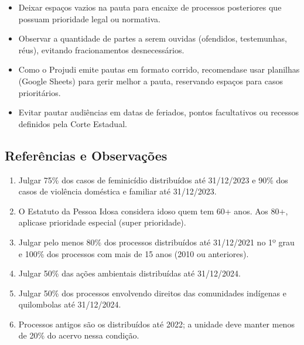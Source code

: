 \documentclass[letterpaper,10pt,brazil]{sphinxmanual}
\begin{document}
\sphinxAtStartPar
{}
\begin{itemize}
\item {} 
\sphinxAtStartPar
Deixar espaços vazios na pauta para encaixe de processos posteriores que possuam prioridade legal ou normativa.

\item {} 
\sphinxAtStartPar
Observar a quantidade de partes a serem ouvidas (ofendidos, testemunhas, réus), evitando fracionamentos desnecessários.

\item {} 
\sphinxAtStartPar
Como o Projudi emite pautas em formato corrido, recomenda\sphinxhyphen{}se usar planilhas (Google Sheets) para gerir melhor a pauta, reservando espaços para casos prioritários.

\item {} 
\sphinxAtStartPar
Evitar pautar audiências em datas de feriados, pontos facultativos ou recessos definidos pela Corte Estadual.

\end{itemize}


\subsection{Referências e Observações}
\label{\detokenize{05pautaraij:referencias-e-observacoes}}\begin{enumerate}
%
\item {} 
\sphinxAtStartPar
{} Julgar 75\% dos casos de feminicídio distribuídos até 31/12/2023 e 90\% dos casos de violência doméstica e familiar até 31/12/2023.

\item {} 
\sphinxAtStartPar
{} O Estatuto da Pessoa Idosa considera idoso quem tem 60+ anos. Aos 80+, aplica\sphinxhyphen{}se prioridade especial (super prioridade).

\item {} 
\sphinxAtStartPar
{} Julgar pelo menos 80\% dos processos distribuídos até 31/12/2021 no 1º grau e 100\% dos processos com mais de 15 anos (2010 ou anteriores).

\item {} 
\sphinxAtStartPar
{} Julgar 50\% das ações ambientais distribuídas até 31/12/2024.

\item {} 
\sphinxAtStartPar
{} Julgar 50\% dos processos envolvendo direitos das comunidades indígenas e quilombolas até 31/12/2024.

\item {} 
\sphinxAtStartPar
{} Processos antigos são os distribuídos até 2022; a unidade deve manter menos de 20\% do acervo nessa condição.

\end{enumerate}
\end{document}
